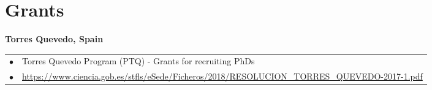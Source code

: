 \documentclass[a4paper,10pt]{report}
\begin{document}
\section{\hspace{0.5cm}Grants}
\begin{adjustwidth}{1.0cm}{0pt}
    {\bf {} Torres Quevedo, Spain} \\
        \begin{tabularx}{\linewidth}{l X}
            \hfill $\bullet$    &   Torres Quevedo Program (PTQ) - Grants for recruiting PhDs \\
            \hfill $\bullet$    &   \url{https://www.ciencia.gob.es/stfls/eSede/Ficheros/2018/RESOLUCION_TORRES_QUEVEDO-2017-1.pdf}
        \end{tabularx}
\end{adjustwidth}

\end{document}
